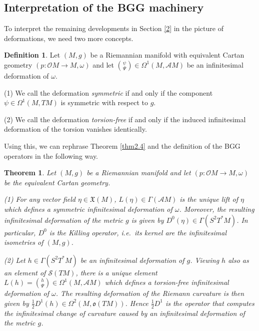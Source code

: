 \documentclass[12pt,a4paper]{amsart}
\def\frak{\mathfrak}
\def\Cal{\mathcal}
\newcommand{\om}{\omega}
\newcommand{\ps}{\psi}
\newcommand{\Ga}{\Gamma}
\newcommand{\Om}{\Omega}
\newcounter{theorem}
\numberwithin{theorem}{section}
\numberwithin{equation}{section}
\newtheorem{thm}[theorem]{Theorem}
\theoremstyle{definition}
\newtheorem{definition}[theorem]{Definition}
\theoremstyle{remark}
\begin{document}
\subsection{Interpretation of the BGG machinery}\label{3.6}
To interpret the remaining developments in Section \ref{2} in the picture of
deformations, we need two more concepts.
\begin{definition}\label{def3.5}
  Let $(M,g)$ be a Riemannian manifold with equivalent Cartan geometry $(p:\Cal OM\to
  M,\om)$ and let $\binom{\ps}{\Psi}\in\Om^1(M,\Cal AM)$ be an infinitesimal
  deformation of $\om$.

(1) We call the deformation \textit{symmetric} if and only if the component
  $\psi\in\Om^1(M,TM)$ is symmetric with respect to $g$.

(2) We call the deformation \textit{torsion-free} if and only if the induced
  infinitesimal deformation of the torsion vanishes identically.
\end{definition}

Using this, we can rephrase Theorem \ref{thm2.4} and the definition of the BGG
operators in the following way.

\begin{thm}\label{thm3.6}
  Let $(M,g)$ be a Riemannian manifold and let $(p:\Cal OM\to M,\om)$ be the
  equivalent Cartan geometry.
  
(1) For any vector field $\eta\in\frak X(M)$, $L(\eta)\in\Ga(\Cal AM)$ is the unique
  lift of $\eta$ which defines a symmetric infinitesimal deformation of
  $\om$. Moreover, the resulting infinitesimal deformation of the metric $g$ is given
  by $D^0(\eta)\in\Ga(S^2T^*M)$. In particular, $D^0$ is the Killing operator,
  i.e.~its kernel are the infinitesimal isometries of $(M,g)$.

(2) Let $h\in\Ga(S^2T^*M)$ be an infinitesimal deformation of $g$. Viewing $h$ also
  as an element of $\Cal S(TM)$, there is a unique element
  $L(h)=\binom{h}{\Psi}\in\Om^1(M,\Cal AM)$ which defines a torsion-free
  infinitesimal deformation of $\om$. The resulting deformation of the Riemann
  curvature is then given by $\frac12D^1(h)\in\Om^2(M,\frak o(TM))$. Hence $\frac12
  D^1$ is the operator that computes the infinitesimal change of curvature caused by
  an infinitesimal deformation of the metric $g$.
\end{thm}
\end{document}

